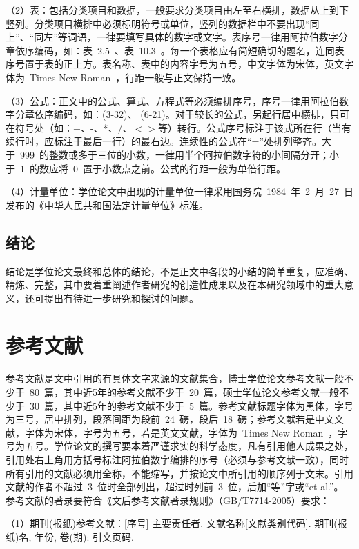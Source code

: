 （2）表：包括分类项目和数据，一般要求分类项目由左至右横排，数据从上到下竖列。分类项目横排中必须标明符号或单位，竖列的数据栏中不要出现“同上”、“同左”等词语，一律要填写具体的数字或文字。表序号一律用阿拉伯数字分章依序编码，如：表~2.5~、表~10.3~。每一个表格应有简短确切的题名，连同表序号置于表的正上方。表名称、表中的内容字号为五号，中文字体为宋体，英文字体为~Times New Roman~，行距一般与正文保持一致。

（3）公式：正文中的公式、算式、方程式等必须编排序号，序号一律用阿拉伯数字分章依序编码，如：(3-32)、 (6-21)。对于较长的公式，另起行居中横排，只可在符号处（如：+、-、*、/、$<$$>$等）转行。公式序号标注于该式所在行（当有续行时，应标注于最后一行）的最右边。连续性的公式在“=”处排列整齐。大于~999~的整数或多于三位的小数，一律用半个阿拉伯数字符的小间隔分开；小于~1~的数应将~0~置于小数点之前。公式的行距一般为单倍行距。

（4）计量单位：学位论文中出现的计量单位一律采用国务院~1984~年~2~月~27~日发布的《中华人民共和国法定计量单位》标准。

\subsection{结论}

结论是学位论文最终和总体的结论，不是正文中各段的小结的简单重复，应准确、精炼、完整，其中要着重阐述作者研究的创造性成果以及在本研究领域中的重大意义，还可提出有待进一步研究和探讨的问题。

\section{参考文献}

参考文献是文中引用的有具体文字来源的文献集合，博士学位论文参考文献一般不少于~80~篇，其中近5年的参考文献不少于~20~篇，硕士学位论文参考文献一般不少于~30~篇，其中近5年的参考文献不少于~5~篇。参考文献标题字体为黑体，字号为三号，居中排列，段落间距为段前~24~磅，段后~18~磅；参考文献若是中文文献，字体为宋体，字号为五号，若是英文文献，字体为~Times New Roman~，字号为五号。学位论文的撰写要本着严谨求实的科学态度，凡有引用他人成果之处，引用处右上角用方括号标注阿拉伯数字编排的序号（必须与参考文献一致），同时所有引用的文献必须用全称，不能缩写，并按论文中所引用的顺序列于文末。引用文献的作者不超过~3~位时全部列出，超过时列前~3~位，后加“等”字或“et al.”。 参考文献的著录要符合《文后参考文献著录规则》（GB/T7714-2005）要求：

（1）期刊(报纸)参考文献：[序号] 主要责任者. 文献名称[文献类别代码]. 期刊(报纸)名, 年份, 卷(期): 引文页码.

